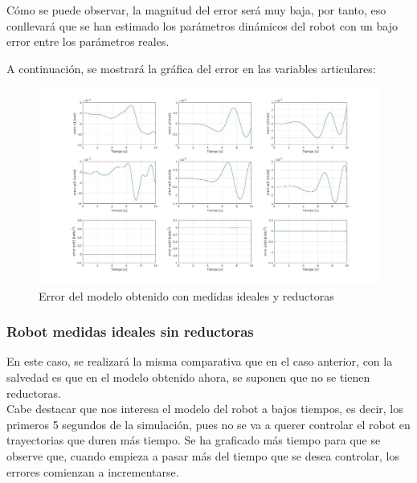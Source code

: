 Cómo se puede observar, la magnitud del error será muy baja, por tanto, eso conllevará que se han estimado los parámetros dinámicos del robot con un bajo error entre los parámetros reales.\\

\newpage

A continuación, se mostrará la gráfica del error en las variables articulares:



\begin{figure}[h!]
	
	\centering
	
	\includegraphics[width=1\textwidth]{EstimacParam_SisModError_In1_IdealCR}
	
	\caption{Error del modelo obtenido con medidas ideales y reductoras}
	
\end{figure}



\subsubsection{Robot medidas ideales sin reductoras}

En este caso, se realizará la misma comparativa que en el caso anterior, con la salvedad es que en el modelo obtenido ahora, se suponen que no se tienen reductoras.\\

Cabe destacar que nos interesa el modelo del robot a bajos tiempos, es decir, los primeros 5 segundos de la simulación, pues no se va a querer controlar el robot en trayectorias que duren más tiempo. Se ha graficado más tiempo para que se observe que, cuando empieza a pasar más del tiempo que se desea controlar, los errores comienzan a incrementarse.\\

